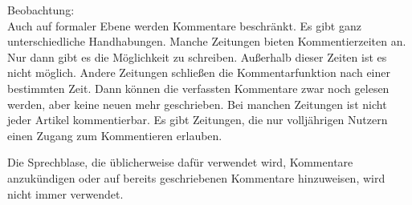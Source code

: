 \begin{landscape}
\begin{longtable}{l|p{170mm}}
\end{longtable}
\end{landscape}

Beobachtung:\\
Auch auf formaler Ebene werden Kommentare beschränkt. Es gibt ganz unterschiedliche Handhabungen. Manche Zeitungen bieten Kommentierzeiten an. Nur dann gibt es die Möglichkeit zu schreiben. Außerhalb dieser Zeiten ist es nicht möglich. Andere Zeitungen schließen die Kommentarfunktion nach einer bestimmten Zeit. Dann können die verfassten Kommentare zwar noch gelesen werden, aber keine neuen mehr geschrieben. Bei manchen Zeitungen ist nicht jeder Artikel kommentierbar. Es gibt Zeitungen, die nur volljährigen Nutzern einen Zugang zum Kommentieren erlauben. 

Die Sprechblase, die üblicherweise dafür verwendet wird, Kommentare anzukündigen oder auf bereits geschriebenen Kommentare hinzuweisen, wird nicht immer verwendet.

